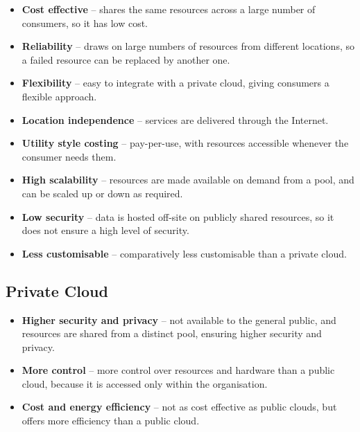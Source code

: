 \documentclass[11pt,a4paper]{article}
\begin{document}
\begin{itemize}\itemsep2pt
  \item \textbf{Cost effective} -- shares the same resources across a large number of
        consumers, so it has low cost.
  \item \textbf{Reliability} -- draws on large numbers of resources from different locations,
        so a failed resource can be replaced by another one.
  \item \textbf{Flexibility} -- easy to integrate with a private cloud, giving consumers a
        flexible approach.
  \item \textbf{Location independence} -- services are delivered through the Internet.
  \item \textbf{Utility style costing} -- pay-per-use, with resources accessible whenever the
        consumer needs them.
  \item \textbf{High scalability} -- resources are made available on demand from a pool, and
        can be scaled up or down as required.
\end{itemize}


\begin{itemize}\itemsep2pt
  \item \textbf{Low security} -- data is hosted off-site on publicly shared resources, so it
        does not ensure a high level of security.
  \item \textbf{Less customisable} -- comparatively less customisable than a private cloud.
\end{itemize}

\subsection{Private Cloud}



\begin{itemize}\itemsep2pt
  \item \textbf{Higher security and privacy} -- not available to the general public, and
        resources are shared from a distinct pool, ensuring higher security and privacy.
  \item \textbf{More control} -- more control over resources and hardware than a public cloud,
        because it is accessed only within the organisation.
  \item \textbf{Cost and energy efficiency} -- not as cost effective as public clouds, but
        offers more efficiency than a public cloud.
\end{itemize}
\end{document}
